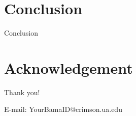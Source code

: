 \documentclass[10pt]{beamer}
\begin{document}
\section{Conclusion}
\begin{frame}{Conclusion}
\end{frame}

\section*{Acknowledgement}
\begin{frame}

  \textcolor{myNewColorA}{\huge{\centerline{Thank you!}}}
  \vspace*{0.5cm}

  \textcolor{myNewColorA}{\Large{\centerline{E-mail: YourBamaID@crimson.ua.edu}}}

\end{frame}
\end{document}
